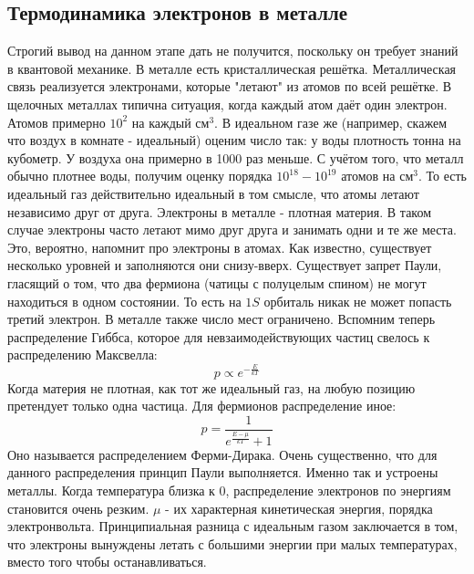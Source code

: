 \documentclass[a4paper, 12pt]{article}
\begin{document}
	\subsection{Термодинамика электронов в металле}
	Строгий вывод на данном этапе дать не получится, поскольку он требует знаний в квантовой механике. В металле есть кристаллическая решётка. Металлическая связь реализуется электронами, которые "летают" из атомов по всей решётке. В щелочных металлах типична ситуация, когда каждый атом даёт один электрон. Атомов примерно $10^{2}$ на каждый $\text{см}^{3}$. В идеальном газе же (например, скажем что воздух в комнате - идеальный) оценим число так: у воды плотность тонна на кубометр. У воздуха она примерно в 1000 раз меньше. С учётом того, что металл обычно плотнее воды, получим оценку порядка $10^{18}-10^{19}$ атомов на $\text{см}^{3}$. То есть идеальный газ действительно идеальный в том смысле, что атомы летают независимо друг от друга. Электроны в металле - плотная материя. В таком случае электроны часто летают мимо друг друга и занимать одни и те же места. Это, вероятно, напомнит про электроны в атомах. Как известно, существует несколько уровней и заполняются они снизу-вверх. Существует запрет Паули, гласящий о том, что два фермиона (чатицы с полуцелым спином) не могут находиться в одном состоянии. То есть на $1S$ орбиталь никак не может попасть третий электрон. В металле также число мест ограничено. Вспомним теперь распределение Гиббса, которое для невзаимодействующих частиц свелось к распределению Максвелла:
	\begin{equation*}
		p \propto e^{-\frac{E}{kT}}
	\end{equation*}
	Когда материя не плотная, как тот же идеальный газ, на любую позицию претендует только одна частица. Для фермионов распределение иное:
	\begin{equation*}
		p = \frac{1}{e^{\frac{E-\mu}{kT}} + 1}
	\end{equation*}
	Оно называется распределением Ферми-Дирака. Очень существенно, что для данного распределения принцип Паули выполняется. Именно так и устроены металлы.  Когда температура близка к 0, распределение электронов по энергиям становится очень резким. $\mu$ - их характерная кинетическая энергия, порядка электронвольта. Принципиальная разница с идеальным газом заключается в том, что электроны вынуждены летать с большими энергии при малых температурах, вместо того чтобы останавливаться. 
	
	
	
\end{document}
